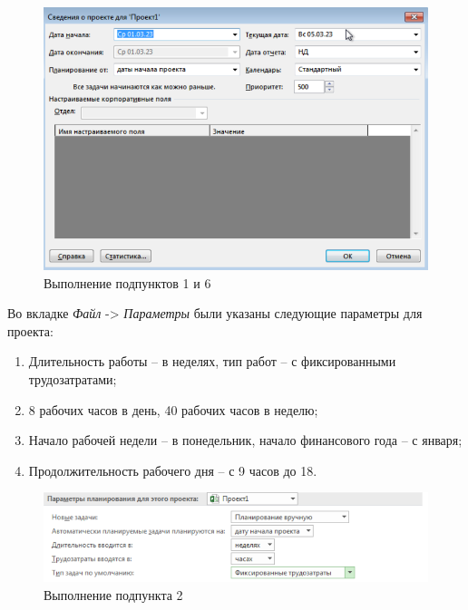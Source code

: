 \FloatBarrier
\begin{figure}[h]	
	\begin{center}
		\includegraphics[width=\linewidth]{inc/1-1.png}
	\end{center}
	\captionsetup{justification=centering}
	\caption{Выполнение подпунктов 1 и 6}
\end{figure}
\FloatBarrier

\newpage
Во вкладке \textit{Файл} -> \textit{Параметры} были указаны следующие параметры для проекта:
\begin{enumerate}
	\item Длительность работы -- в неделях, тип работ -- с фиксированными трудозатратами;
	\item 8 рабочих часов в день, 40 рабочих часов в неделю;
	\item Начало рабочей недели -- в понедельник, начало финансового года -- с января;
	\item Продолжительность рабочего дня -- с 9 часов до 18.
\end{enumerate}

\FloatBarrier
\begin{figure}[h]	
	\begin{center}
		\includegraphics[width=\linewidth]{inc/1-2.png}
	\end{center}
	\captionsetup{justification=centering}
	\caption{Выполнение подпункта 2}
\end{figure}
\FloatBarrier


